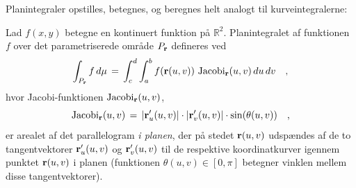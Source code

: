 Planintegraler opstilles, betegnes, og beregnes helt analogt til kurveintegralerne:


\begin{definition}[Planintegral] \label{defPlanInt}
Lad $f(x,y)$ betegne en kontinuert funktion på $\mathbb{R}^{2}$.
Planintegralet af funktionen $f$ over det parametriserede område
$P_{\bf r}$ defineres ved
\begin{equation} \label{eqPlanIntegral}
\int_{P_{\bf r}} f \, d\mu \, = \, \int_{c}^{d} \int_{a}^{b}
f({\bf r}(u,v))\, \operatorname{Jacobi}_{\bf r}(u,v)\,du \, dv \quad,
\end{equation}
hvor Jacobi-funktionen $\operatorname{Jacobi}_{\bf r}(u,v)$,
\begin{equation} \label{eqJacPlan}
 \operatorname{Jacobi}_{\bf r}(u,v)\, = \,
 | {\bf r}'_{u}(u,v) | \cdot | {\bf
r}'_{v}(u,v) | \cdot \sin(\theta(u,v)) \quad,
\end{equation}
er arealet af det parallelogram {\em{i planen}}, der på
stedet ${\bf r}(u,v)$ udspændes af de to
tangentvektorer ${\bf r}'_{u}(u,v)$ og ${\bf
 r}'_{v}(u,v)$ til de respektive koordinatkurver igennem punktet
${\bf r}(u,v)$ i planen (funktionen $\theta(u, v)\in [0, \pi]$
betegner vinklen mellem disse tangentvektorer).
\end{definition}




